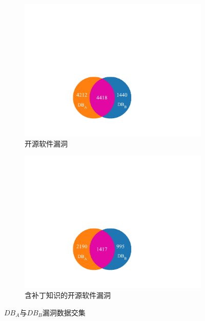 \begin{figure}[!t]
    \centering
    \begin{subfigure}[b]{0.45\textwidth}
    \centering
    \includegraphics[scale=0.98]{fig/rq1-CVE-IDs-VS.pdf}
    \caption{开源软件漏洞}\label{fig:rq1-cves}
    \end{subfigure}
    \begin{subfigure}[b]{0.45\textwidth}
    \centering
    \includegraphics[scale=0.98]{fig/rq1-CVE-IDs-Patches-VS.pdf}
    \caption{含补丁知识的开源软件漏洞}\label{fig:rq1-cves-with-patches}
    \end{subfigure}
    \caption{$DB_A$与$DB_B$漏洞数据交集}\label{fig:intersection}
\end{figure}

